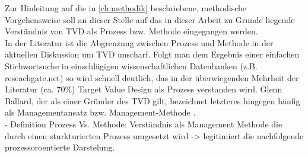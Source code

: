 %
%
%
%
%
%

Zur Hinleitung auf die in \cref{ch:methodik} beschriebene, methodische Vorgehensweise soll an dieser Stelle auf das in dieser Arbeit zu Grunde liegende Verständnis von \ac{TVD} als Prozess bzw. Methode eingegangen werden.\\
In der Literatur ist die Abgrenzung zwischen Prozess und Methode in der aktuellen Diskussion um TVD unscharf. Folgt man dem Ergebnis einer einfachen Stichwortsuche in einschlägigen wissenschaftlichen Datenbanken (z.B. reseachgate.net) so wird schnell deutlich, das in der überwiegenden Mehrheit der Literatur (ca. 70\%) Target Value Design als Prozess verstanden wird.
Glenn Ballard, der als einer Gründer des \ac{TVD} gilt, bezeichnet letzteres hingegen häufig als Managementansatz bzw. Management-Methode \autocite[]{}.\\

- Definition Prozess Vs. Methode: Verständnis als Management Methode die durch einen sturkturierten Prozess umgesetzt wird -> legitimiert die nachfolgende prozessoroentierte Darstelung.\\